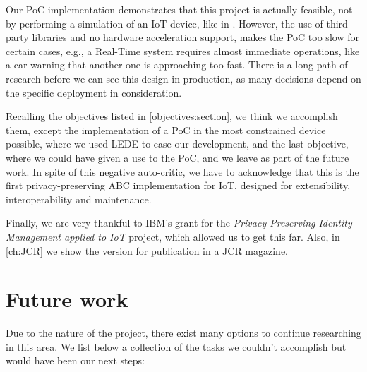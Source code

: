 Our PoC implementation demonstrates that this project is actually feasible, not by performing a simulation of an IoT device, like in \citep{vanet}. However, the use of third party libraries and no hardware acceleration support, makes the PoC too slow for certain cases, e.g., a Real-Time system requires almost immediate operations, like a car warning that another one is approaching too fast.
There is a long path of research before we can see this design in production, as many decisions depend on the specific deployment in consideration.


Recalling the objectives listed in \autoref{objectives:section}, we think we accomplish them, except the implementation of a PoC in the most constrained device possible, where we used LEDE to ease our development, and the last objective, where we could have given a use to the PoC, and we leave as part of the future work. In spite of this negative auto-critic, we have to acknowledge that this is the first privacy-preserving ABC implementation for IoT, designed for extensibility, interoperability and maintenance.

Finally, we are very thankful to IBM's grant for the \textit{Privacy Preserving Identity Management applied to IoT} project, which allowed us to get this far. Also, in \autoref{ch:JCR} we show the version for publication in a JCR magazine.


\section{Future work}


Due to the nature of the project, there exist many options to continue researching in this area. We list below a collection of the tasks we couldn't accomplish but would have been our next steps:

